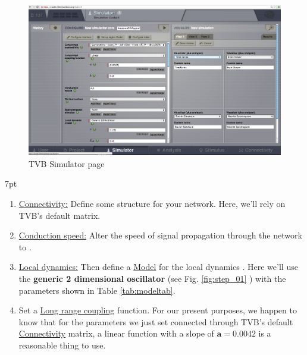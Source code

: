 \documentclass{tufte-handout}
\newenvironment{simulation}{%
  \def\FrameCommand{%
    \hspace{1pt}%
    {\color{ForestGreen}\vrule width 2pt}%
    {\color{simulationshade}\vrule width 4pt}%
    \colorbox{simulationshade}%
  }%
  \MakeFramed{\advance\hsize-\width\FrameRestore}%
  \noindent\hspace{-4.55pt}%
  \begin{adjustwidth}{}{7pt}%
  \vspace{2pt}\vspace{2pt}%
}
{%
  \vspace{2pt}\end{adjustwidth}\endMakeFramed%
}
\begin{document}
\begin{figure}[h]
  \includegraphics[width=\linewidth]{Handout_UI_BuildingYourOwnBrainNetworkModel_SimulatorArea}%
  \caption{TVB Simulator page}%
  \label{fig:fig}%
\end{figure}


\begin{simulation}
\begin{enumerate}
\item \underline{Connectivity:} Define some structure for your network. Here, we'll rely on TVB's default  matrix. 

\item \underline{Conduction speed:} Alter the speed of signal propagation through the network to \textbf{}. 

\item \underline{Local dynamics:} Then define a \underline{Model} for the local dynamics . Here we'll use the \textbf{generic 2 dimensional oscillator} (see Fig. \ref{fig:step_01} ) with the parameters shown in Table \ref{tab:modeltab}.

\item Set a \underline{Long range coupling} function. For our present purposes, we happen to know that for the parameters we just set connected through TVB's default \underline{Connectivity} matrix, a linear function with a slope of $\mathbf{a=0.0042}$ is a reasonable thing to use. 

\end{enumerate}
\end{simulation}
\end{document}
